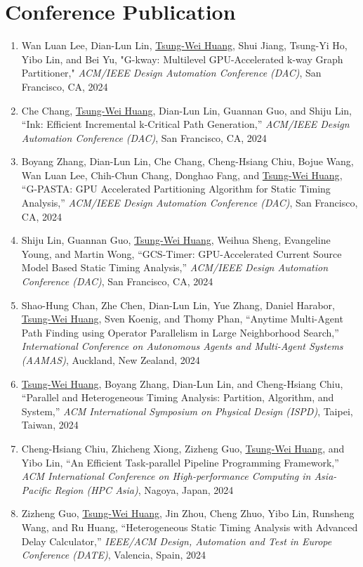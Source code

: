 \documentclass[A4,11pt]{article}
\begin{document}
\section{Conference Publication}
 \begin{enumerate}
 \itemsep-3pt
    \item Wan Luan Lee, Dian-Lun Lin, \underline{Tsung-Wei Huang}, Shui Jiang, Tsung-Yi Ho, Yibo Lin, and Bei Yu, "G-kway: Multilevel GPU-Accelerated k-way Graph Partitioner," \textit{ACM/IEEE Design Automation Conference (DAC)}, San Francisco, CA, 2024
    \item Che Chang, \underline{Tsung-Wei Huang}, Dian-Lun Lin, Guannan Guo, and Shiju Lin, ``Ink: Efficient Incremental k-Critical Path Generation,'' \textit{ACM/IEEE Design Automation Conference (DAC)}, San Francisco, CA, 2024
    \item Boyang Zhang, Dian-Lun Lin, Che Chang, Cheng-Hsiang Chiu, Bojue Wang, Wan Luan Lee, Chih-Chun Chang, Donghao Fang, and \underline{Tsung-Wei Huang}, ``G-PASTA: GPU Accelerated Partitioning Algorithm for Static Timing Analysis,'' \textit{ACM/IEEE Design Automation Conference (DAC)}, San Francisco, CA, 2024
    \item Shiju Lin, Guannan Guo, \underline{Tsung-Wei Huang}, Weihua Sheng, Evangeline Young, and Martin Wong, ``GCS-Timer: GPU-Accelerated Current Source Model Based Static Timing Analysis,'' \textit{ACM/IEEE Design Automation Conference (DAC)}, San Francisco, CA, 2024
    \item Shao-Hung Chan, Zhe Chen, Dian-Lun Lin, Yue Zhang, Daniel Harabor, \underline{Tsung-Wei Huang}, Sven Koenig, and Thomy Phan, ``Anytime Multi-Agent Path Finding using Operator Parallelism in Large Neighborhood Search,'' \textit{International Conference on Autonomous Agents and Multi-Agent Systems (AAMAS)}, Auckland, New Zealand, 2024
    \item \underline{Tsung-Wei Huang}, Boyang Zhang, Dian-Lun Lin, and Cheng-Hsiang Chiu, ``Parallel and Heterogeneous Timing Analysis: Partition, Algorithm, and System,'' \textit{ACM International Symposium on Physical Design (ISPD)}, Taipei, Taiwan, 2024
    \item Cheng-Hsiang Chiu, Zhicheng Xiong, Zizheng Guo, \underline{Tsung-Wei Huang}, and Yibo Lin, ``An Efficient Task-parallel Pipeline Programming Framework,'' \textit{ACM International Conference on High-performance Computing in Asia-Pacific Region (HPC Asia)}, Nagoya, Japan, 2024
    \item Zizheng Guo, \underline{Tsung-Wei Huang}, Jin Zhou, Cheng Zhuo, Yibo Lin, Runsheng Wang, and Ru Huang, ``Heterogeneous Static Timing Analysis with Advanced Delay Calculator,'' \textit{IEEE/ACM Design, Automation and Test in Europe Conference (DATE)}, Valencia, Spain, 2024

\end{enumerate}
\end{document}
